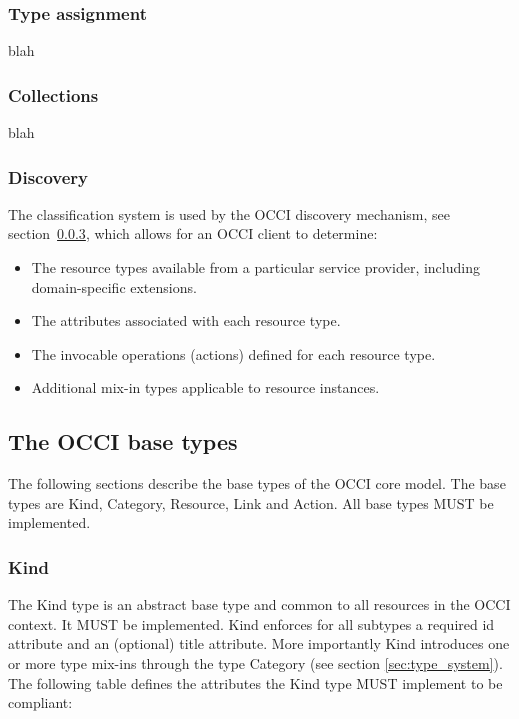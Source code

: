 \documentclass[10pt,a4paper,british]{article}
\begin{document}
\subsubsection{Type assignment}
blah

\subsubsection{Collections}
blah

\subsubsection{Discovery}
\label{sec:discovery}
The classification system is used by the OCCI discovery mechanism, see
section~\ref{sec:discovery}, which allows for an OCCI client to determine:
\begin{itemize}
\item The resource types available from a particular service provider, including domain-specific extensions.
\item The attributes associated with each resource type.
\item The invocable operations (actions) defined for each resource type.
\item Additional mix-in types applicable to resource instances.
\end{itemize}

\subsection{The OCCI base types}
\label{sec:base_types}
The following sections describe the base types of the OCCI core
model. The base types are Kind, Category, Resource, Link and
Action. All base types MUST be implemented.

\subsubsection{Kind}
The Kind type is an abstract base type and common to all resources in
the OCCI context. It MUST be implemented. Kind enforces for all
subtypes a required id attribute and an (optional) title
attribute. More importantly Kind introduces one or more type mix-ins
through the type Category (see section \ref{sec:type_system}). The
following table defines the attributes the Kind type MUST implement to
be compliant:
\end{document}
